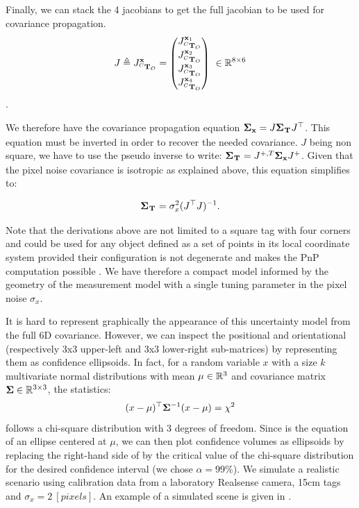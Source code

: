 Finally, we can stack the 4 jacobians to get the full jacobian to be used for covariance propagation.
\begin{equation}
    J \triangleq J^{{\bf x}}_{\prescript{C}{}{{\bf T}}_{O}}=
    \begin{pmatrix}
    J^{{\bf x}_1}_{\prescript{C}{}{{\bf T}}_{O}} \\ J^{{\bf x}_2}_{\prescript{C}{}{{\bf T}}_{O}} \\ J^{{\bf x}_3}_{\prescript{C}{}{{\bf T}}_{O}} \\ J^{{\bf x}_4}_{\prescript{C}{}{{\bf T}}_{O}}
    \end{pmatrix}
    ~ \in \mathbb{R}^{8 \times 6}
\end{equation}.

We therefore have the covariance propagation equation ${\bm \Sigma}_{{\bf x}} = J {\bm \Sigma}_{\prescript{}{}{{\bf T}}_{}} J^{\top}$. 
This equation must be inverted in order to recover the needed covariance. $J$ being non square, 
we have to use the pseudo inverse to write: ${\bm \Sigma}_{\prescript{}{}{{\bf T}}_{}} = J^{+,T} {\bm \Sigma}_{{\bf x}} J^{+}$. 
Given that the pixel noise covariance is isotropic as explained above, this equation simplifies to:

\begin{equation}
    {\bm \Sigma}_{\prescript{}{}{{\bf T}}_{}} = \sigma_{x}^2(J^{\top} J)^{-1}.
\end{equation}

Note that the derivations above are not limited to a square tag with four corners and could be used for any object defined as
a set of points in its local coordinate system provided their configuration is not degenerate and makes the PnP computation possible \cite{gao2003complete}.  
We have therefore a compact model informed by the geometry of the measurement model with a single tuning parameter in the pixel noise $\sigma_x$.

It is hard to represent graphically the appearance of this uncertainty model from the full 6D covariance. However, we can inspect the positional and orientational
(respectively 3x3 upper-left and 3x3 lower-right sub-matrices) by representing them as confidence ellipsoids.
In fact, for a random variable $x$ with a size $k$ multivariate normal distributions with mean $\mu \in \mathbb{R}^3$ and 
covariance matrix ${\bm \Sigma} \in \mathbb{R}^{3 \times 3}$, the statistics:
%
\begin{equation}
    (x - \mu)^{\top} {\bm \Sigma}^{-1}(x - \mu) = \chi^2
    \label{eq:chi2}
\end{equation}
%
follows a chi-square distribution with 3 degrees of freedom. Since  is the equation of an ellipse centered at $\mu$, we can then plot confidence volumes as ellipsoids by replacing the right-hand side of  
 by the critical value of the chi-square distribution for the desired confidence interval (we chose $\alpha=99\%$). We simulate a 
realistic scenario using calibration data from a laboratory Realsense camera, 15cm tags and $\sigma_x = 2~[pixels]$. An example of a simulated scene is given
in . 

